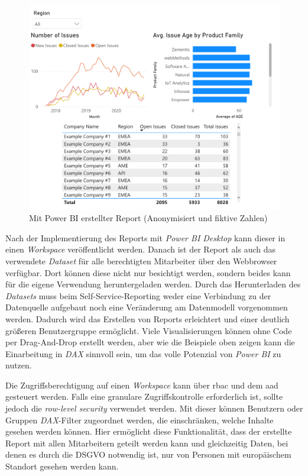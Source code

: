 \begin{figure}[htbp]
 \centering
 \includegraphics[width=\textwidth]{gfx/pbi_report.pdf}
 \caption[Power BI Report]{Mit Power BI erstellter Report (Anonymisiert und fiktive Zahlen)}
\label{fig:praktischeUmsetzung:pbiRep}
\end{figure}

Nach der Implementierung des Reports mit \textit{Power BI Desktop} kann dieser in einen \textit{Workspace} veröffentlicht werden. Danach ist der Report als auch das verwendete \textit{Dataset} für alle berechtigten Mitarbeiter über den Webbrowser verfügbar. Dort können diese nicht nur besichtigt werden, sondern beides kann für die eigene Verwendung heruntergeladen werden. Durch das Herunterladen des \textit{Datasets} muss beim Self-Service-Reporting weder eine Verbindung zu der Datenquelle aufgebaut noch eine Veränderung am Datenmodell vorgenommen werden. Dadurch wird das Erstellen von Reports erleichtert und einer deutlich größeren Benutzergruppe ermöglicht. Viele Visualisierungen können ohne Code per Drag-And-Drop erstellt werden, aber wie die Beispiele oben zeigen kann die Einarbeitung in \textit{DAX} sinnvoll sein, um das volle Potenzial von \textit{Power BI} zu nutzen.

Die Zugriffsberechtigung auf einen \textit{Workspace} kann über \ac{rbac} und dem \ac{aad} gesteuert werden. Falls eine granulare Zugriffskontrolle erforderlich ist, sollte jedoch die \textit{row-level security} verwendet werden. Mit dieser können Benutzern oder Gruppen \textit{DAX}-Filter zugeordnet werden, die einschränken, welche Inhalte gesehen werden können. Hier ermöglicht diese Funktionalität, dass der erstellte Report mit allen Mitarbeitern geteilt werden kann und gleichzeitig Daten, bei denen es durch die DSGVO notwendig ist, nur von Personen mit europäischem Standort gesehen werden kann.

